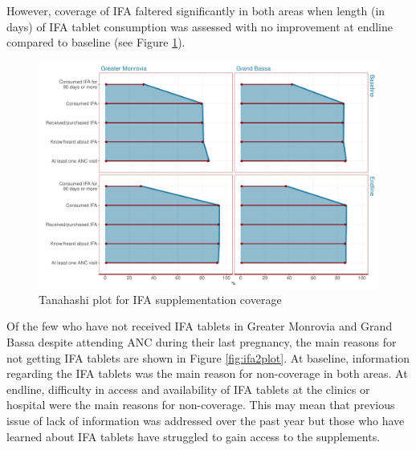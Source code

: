 \documentclass[12pt,a4paper]{article}
\begin{document}
However, coverage of IFA faltered significantly in both areas when length (in days) of IFA tablet consumption was assessed with no improvement at endline compared to baseline (see Figure \ref{fig:ifaTanahashiPlot}).

\begin{figure}[H]

{\centering \includegraphics{liberiaCoverageFinalReport_files/figure-latex/ifaTanahashiPlot-1} 

}

\caption{Tanahashi plot for IFA supplementation coverage}\label{fig:ifaTanahashiPlot}
\end{figure}

Of the few who have not received IFA tablets in Greater Monrovia and Grand Bassa despite attending ANC during their last pregnancy, the main reasons for not getting IFA tablets are shown in Figure \ref{fig:ifa2plot}. At baseline, information regarding the IFA tablets was the main reason for non-coverage in both areas. At endline, difficulty in access and availability of IFA tablets at the clinics or hospital were the main reasons for non-coverage. This may mean that previous issue of lack of information was addressed over the past year but those who have learned about IFA tablets have struggled to gain access to the supplements.
\end{document}
